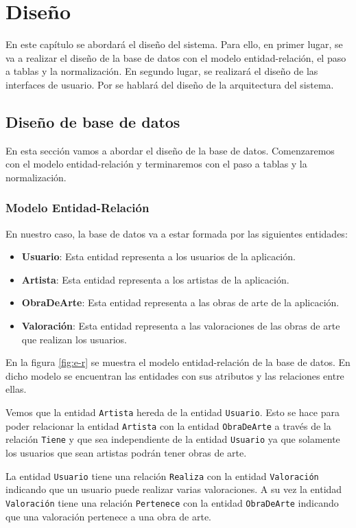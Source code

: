 \chapter{Diseño}
En este capítulo se abordará el diseño del sistema. Para ello, en primer
lugar, se va a realizar el diseño de la base de datos con el modelo
entidad-relación, el paso a tablas y la normalización. En segundo lugar,
se realizará el diseño de las interfaces de usuario. Por se hablará del
diseño de la arquitectura del sistema.

\section{Diseño de base de datos}
En esta sección vamos a abordar el diseño de la base de datos.
Comenzaremos con el modelo entidad-relación y terminaremos con el paso a
tablas y la normalización.

\subsection{Modelo Entidad-Relación}
En nuestro caso, la base de datos va a estar formada por las siguientes
entidades:

\begin{itemize}
    \item \textbf{Usuario}: Esta entidad representa a los usuarios de la aplicación.
    \item \textbf{Artista}: Esta entidad representa a los artistas de la aplicación.
    \item \textbf{ObraDeArte}: Esta entidad representa a las obras de arte de la aplicación.
    \item \textbf{Valoración}: Esta entidad representa a las valoraciones de las obras de
    arte que realizan los usuarios.
\end{itemize}

En la figura \ref{fig:e-r} se muestra el modelo entidad-relación de la base de
datos. En dicho modelo se encuentran las entidades con sus atributos y las
relaciones entre ellas.

Vemos que la entidad \texttt{Artista} hereda de la entidad \texttt{Usuario}.
Esto se hace para poder relacionar la entidad \texttt{Artista} con la entidad
\texttt{ObraDeArte} a través de la relación \texttt{Tiene} y que sea independiente
de la entidad \texttt{Usuario} ya que solamente los usuarios que sean artistas
podrán tener obras de arte.

La entidad \texttt{Usuario} tiene una relación \texttt{Realiza} con la entidad
\texttt{Valoración} indicando que un usuario puede realizar varias valoraciones.
A su vez la entidad \texttt{Valoración} tiene una relación \texttt{Pertenece} con
la entidad \texttt{ObraDeArte} indicando que una valoración pertenece a una obra
de arte.

